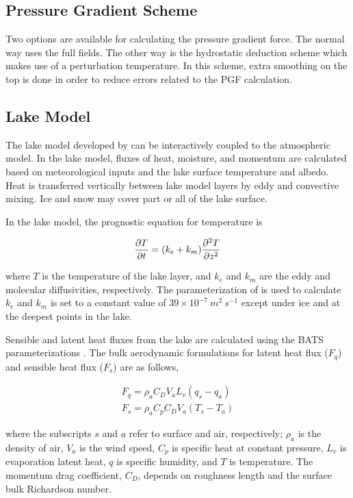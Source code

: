 {\subsection{Pressure Gradient Scheme}

Two options are available for
calculating the pressure gradient force.  The normal way uses the full fields.
The other way is the hydrostatic deduction scheme which makes use of a
perturbation temperature.  In this scheme, extra smoothing on the top is done in
order to reduce errors related to the PGF calculation. 

\subsection{Lake Model}
The lake model developed by \cite{Hostetler_93} can
be interactively coupled to the atmospheric model.  In the lake model, fluxes of
heat, moisture, and momentum are calculated based on meteorological inputs and
the lake surface temperature and albedo.  Heat is transferred vertically between
lake model layers by eddy and convective mixing.  Ice and snow may cover part or
all of the lake surface.

In the lake model, the prognostic equation for temperature is

\begin{eqnarray}
{\partial{T}\over \partial{t}} = (k_e + k_m) {\partial^2{T}\over \partial{z}^2 }
\end{eqnarray}

where $T$ is the temperature of the lake layer, and $k_e$ and $k_m$
are the eddy and molecular diffusivities, respectively.   The parameterization
of \cite{Henderson-Sellers_86} is used to calculate $k_e$ and $k_m$ is set to a
constant value of $39 \times 10^{-7}~m^2~s^{-1}$ except under ice and at the
deepest points in the lake.

Sensible and latent heat fluxes from the lake are calculated using  the BATS
parameterizations \cite{Dickinson_93}.  The bulk aerodynamic formulations for
latent heat flux ($F_q$) and sensible heat flux ($F_s$) are as follows,

\begin{eqnarray}
F_q = \rho_a C_D V_a L_v (q_s - q_a) \\ F_s = \rho_a C_p C_D V_a (T_s - T_a)
\end{eqnarray}

where the subscripts $s$ and $a$ refer to surface and air,
respectively; $\rho_a$ is the density of air, $V_a$ is the wind speed, $C_p$
is specific heat at constant pressure, $L_v$ is evaporation latent
heat, $q$ is specific humidity, and $T$ is temperature.  The momentum drag
coefficient, $C_D$, depends on roughness length and the surface bulk Richardson
number.

}
